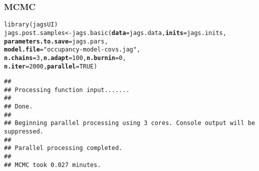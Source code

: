 \documentclass[color=usenames,dvipsnames]{beamer}\usepackage[]{graphicx}\usepackage[]{xcolor}
\makeatletter
\newcommand{\hlnum}[1]{\textcolor[rgb]{0.69,0.494,0}{#1}}%
\newcommand{\hlsng}[1]{\textcolor[rgb]{0.749,0.012,0.012}{#1}}%
\newcommand{\hldef}[1]{\textcolor[rgb]{0,0,0}{#1}}%
\newcommand{\hlkwb}[1]{\textcolor[rgb]{0,0.341,0.682}{#1}}%
\newcommand{\hlkwc}[1]{\textcolor[rgb]{0,0,0}{\textbf{#1}}}%
\newcommand{\hlkwd}[1]{\textcolor[rgb]{0.004,0.004,0.506}{#1}}%
\newenvironment{kframe}{%
 \def\at@end@of@kframe{}%
 \ifinner\ifhmode%
  \def\at@end@of@kframe{\end{minipage}}%
  \begin{minipage}{\columnwidth}%
 \fi\fi%
 \def\FrameCommand##1{\hskip\@totalleftmargin \hskip-\fboxsep
 \colorbox{shadecolor}{##1}\hskip-\fboxsep
     \hskip-\linewidth \hskip-\@totalleftmargin \hskip\columnwidth}%
 \MakeFramed {\advance\hsize-\width
   \@totalleftmargin\z@ \linewidth\hsize
   \@setminipage}}%
 {\par\unskip\endMakeFramed%
 \at@end@of@kframe}
\newenvironment{knitrout}{}{} %
\makeatother
\begin{document}
\begin{frame}[fragile]
  \frametitle{MCMC}
  \small
\begin{knitrout}\scriptsize
{}\color{fgcolor}\begin{kframe}
\begin{alltt}
\hlkwd{library}\hldef{(jagsUI)}
\hldef{jags.post.samples} \hlkwb{<-} \hlkwd{jags.basic}\hldef{(}\hlkwc{data}\hldef{=jags.data,} \hlkwc{inits}\hldef{=jags.inits,}
                                \hlkwc{parameters.to.save}\hldef{=jags.pars,}
                                \hlkwc{model.file}\hldef{=}\hlsng{"occupancy-model-covs.jag"}\hldef{,}
                                \hlkwc{n.chains}\hldef{=}\hlnum{3}\hldef{,} \hlkwc{n.adapt}\hldef{=}\hlnum{100}\hldef{,} \hlkwc{n.burnin}\hldef{=}\hlnum{0}\hldef{,}
                                \hlkwc{n.iter}\hldef{=}\hlnum{2000}\hldef{,} \hlkwc{parallel}\hldef{=}\hlnum{TRUE}\hldef{)}
\end{alltt}
\begin{verbatim}
## 
## Processing function input....... 
## 
## Done. 
##  
## Beginning parallel processing using 3 cores. Console output will be suppressed.
## 
## Parallel processing completed.
## 
## MCMC took 0.027 minutes.
\end{verbatim}
\end{kframe}
\end{knitrout}
\end{frame}
\end{document}
